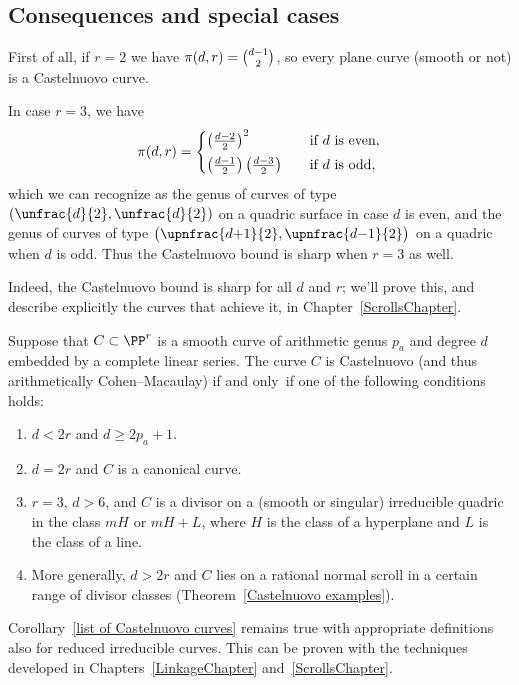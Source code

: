  \subsection*{Consequences and special cases}

 First of all, 
if
$r=2$ we have $\pi(d,r) = \tbinom{d-1}{2}$,
 so every 
plane curve
(smooth or not) 
is a Castelnuovo curve.
%

 In case $r=3$, we have
 $$
 \pi(d,r) =
 \begin{cases}
 \left(\frac{d-2}{2} \right)^2& \quad \text{if $d$ is even}, \\
\noalign{\vskip3pt}
 \left(\frac{d-1}{2} \right)\left(\frac{d-3}{2} \right)& \quad \text{if
 $d$ is odd},
 \end{cases}
 $$
 which we can recognize as the genus of curves of type $(\unfrac{d}{2},
 \unfrac{d}{2} )$ on a quadric surface in case $d$ is even, and the genus
 of curves of type
 $\bigl(\upnfrac{d{+}1}{2}, \upnfrac{d{-}1}{2} \bigr)$ 
on a quadric when $d$ is odd. Thus
the Castelnuovo bound is sharp when $r=3$ as well.

Indeed, the Castelnuovo bound is sharp for all $d$ and $r$; we'll
prove this, and describe explicitly the curves that achieve it, in
Chapter~\ref{ScrollsChapter}.


\begin{corollary}\label{list of Castelnuovo curves}
Suppose that $C\subset \PP^r$ is a smooth curve of arithmetic genus
$p_{a}$ and degree $d$ embedded by a complete linear series. The curve
$C$ is  Castelnuovo (and thus arithmetically Cohen--Macaulay) if and
only~if one of the following 
conditions
holds:
\begin{enumerate}
\item  $d<2r$ and  $d \geq 2p_a+1$.
\item $d=2r$ 
and
$C$ is a canonical curve.
\item $r=3$, $d>6$, 
and
$C$ is a divisor on a (smooth or singular)
irreducible quadric in the class $mH$ or $mH+L$, where $H$ is the class
of a hyperplane and $L$ is the class of a line.
\item  More generally,  $d>2r$ 
and
$C$ lies on a rational normal scroll in a certain range of divisor classes
\rm
(Theorem~\ref{Castelnuovo examples}).
\end{enumerate}
\end{corollary}

\begin{fact}
Corollary~\ref{list of Castelnuovo curves} remains true with appropriate
definitions also for reduced irreducible curves. This can be proven
with the techniques developed in Chapters~\ref{LinkageChapter}
and~\ref{ScrollsChapter}.
\end{fact}

